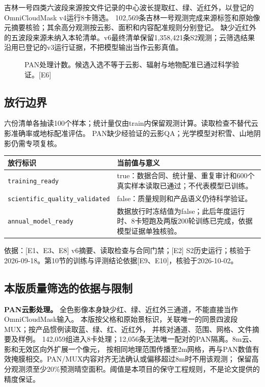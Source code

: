 \documentclass[UTF8,fontset=fandol,zihao=5,a4paper]{ctexart}
\newcommand{\source}[1]{\par{\footnotesize\color{muted}依据：#1}\par}
\newcommand{\reportpage}{\clearpage}
\begin{document}
吉林一号四类六波段来源按文件记录的中心波长提取红、绿、近红外，以登记的OmniCloudMask v4运行8卡筛选\cite{ocm}。
102,569条吉林一号观测完成来源标签和原始像元摘要核验；其余高分观测按云影、面积和内容配准规则分别登记。
缺少近红外的五波段来源未纳入本轮清单。v6最终清单保留1,358,421条S2观测；云筛选结果沿用已登记的v3运行证据，不把模型输出当作云影真值。

\begin{figure}[h]
\centering
{}
\caption{PAN处理计数。候选入选不等于云影、辐射与地物配准已通过科学验证。[E6]}
\end{figure}

\subsection{放行边界}
六份清单各抽读100个样本；统计量仅由train内保留观测计算。读取检查不替代云影准确率或地标配准评估。
PAN缺少经验证的云影QA；光学模型对积雪、山地阴影仍需专项复核。

\noindent\begin{tabularx}{\linewidth}{@{}p{4cm}Y@{}}
\toprule 放行标识 & 当前值与意义\\\midrule
\texttt{training\_ready} & true：数据合同、统计量、重复审计和600个真实样本读取已通过；不代表模型已训练。\\
{\scriptsize\texttt{scientific\_quality\_validated}} & false：质量规则和产品语义仍待科学验证。\\
\texttt{annual\_model\_ready} & 数据放行时冻结值为false；此后年度运行时、8卡短跑及两版200轮训练已完成，依据模型证据单独核验。\\\bottomrule
\end{tabularx}
\source{[E1、E3、E8] v6摘要、读取检查与合同门禁；[E2] S2历史运行；核验于2026-09-18。第10节的训练与评测结论依据[E9、E10]，核验于2026-10-02。}

\reportpage
\subsection{本版质量筛选的依据与限制}
\textbf{PAN云影处理。} 全色影像本身缺少红、绿、近红外三通道，不能直接当作OmniCloudMask输入。
本版按父格和原始景标识，关联唯一的同景四波段MUX；按产品惯例读取蓝、绿、红、近红外，
并核对通道、范围、网格、文件摘要及样例\cite{ocm,gfguide}。
142,059组进入8卡处理；12,056条无法唯一配对的PAN隔离。8m云、影和无效区向外扩展一个像元，
按相同地理范围传播至2m网格，再与PAN数值有效掩膜相交。PAN/MUX内容对齐无法确认或偏移超过8m时不用该观测；
保留高分观测须至少20\%预测晴空面积。阈值是本项目的保守工程规则，不是论文提供的精度保证。
\end{document}
